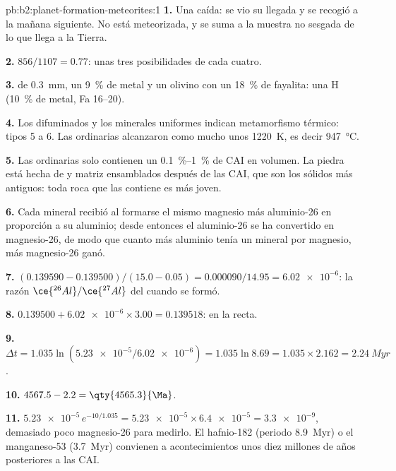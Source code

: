 \begin{solution}{pb:b2:planet-formation-meteorites:1}
\textbf{1.} Una caída: se vio su llegada y se recogió a la mañana siguiente.
No está meteorizada, y se suma a la muestra no sesgada de lo que llega a la Tierra.

\textbf{2.} $856/1107 = 0.77$: unas tres posibilidades de cada cuatro.

\textbf{3.}  de \qty{0.3}{mm}, un \qty{9}{\percent} de metal y un olivino con
un \qty{18}{\percent} de fayalita: una  H (\qty{10}{\percent} de metal, Fa 16--20).

\textbf{4.} Los  difuminados y los minerales uniformes indican metamorfismo térmico: tipos
5 a 6. Las  ordinarias alcanzaron como mucho unos \qty{1220}{K}, es decir
\qty{947}{\degreeCelsius}.

\textbf{5.} Las  ordinarias solo contienen un \qtyrange{0.1}{1}{\percent} de CAI en
volumen. La piedra está hecha de  y matriz ensamblados después de las CAI, que
son los sólidos más antiguos: toda roca que las contiene es más joven.

\textbf{6.} Cada mineral recibió al formarse el mismo magnesio más aluminio-26
en proporción a su aluminio; desde entonces el aluminio-26 se ha convertido en
magnesio-26, de modo que cuanto más aluminio tenía un mineral por magnesio, más
magnesio-26 ganó.

\textbf{7.} $(0.139590 - 0.139500)/(15.0 - 0.05) = \num{0.000090}/14.95 =
\num{6.02e-6}$: la razón $\ce{^{26}Al}/\ce{^{27}Al}$ del  cuando se
formó.

\textbf{8.} $0.139500 + \num{6.02e-6}\times3.00 = 0.139518$: en la recta.

\textbf{9.} $\Delta t = 1.035\ln(\num{5.23e-5}/\num{6.02e-6}) = 1.035\ln8.69 =
1.035\times2.162 = \qty{2.24}{Myr}$.

\textbf{10.} $4567.5 - 2.2 = \qty{4565.3}{\Ma}$.

\textbf{11.} $\num{5.23e-5}\,e^{-10/1.035} = \num{5.23e-5}\times\num{6.4e-5} =
\num{3.3e-9}$, demasiado poco magnesio-26 para medirlo. El hafnio-182 (periodo
\qty{8.9}{Myr}) o el manganeso-53 (\qty{3.7}{Myr}) convienen a acontecimientos unos diez millones de años
posteriores a las CAI.


\end{solution}

